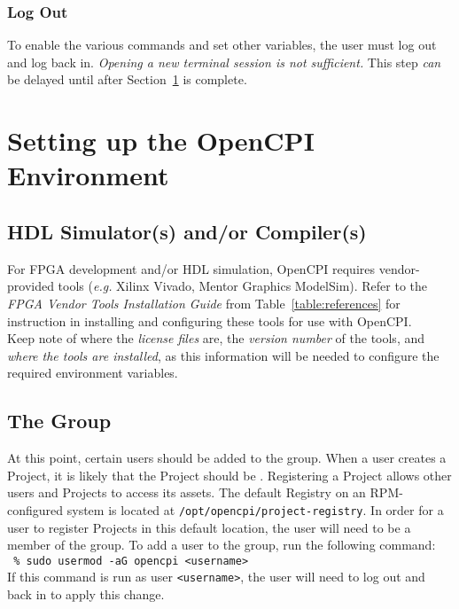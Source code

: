 \subsubsection{Log Out}
To enable the various  commands and set other variables, the user must log out and log back in. \textit{Opening a new terminal session is not sufficient.} This step \textit{can} be delayed until after Section~\ref{sec:setup_opencpi} is complete.

\section{Setting up the OpenCPI Environment}
\label{sec:setup_opencpi}
\subsection{HDL Simulator(s) and/or Compiler(s)}
\label{subsec:installing_fpga_vendor}
For FPGA development and/or HDL simulation, OpenCPI requires vendor-provided tools (\textit{e.g.} Xilinx Vivado, Mentor Graphics ModelSim). Refer to the \textit{FPGA Vendor Tools Installation Guide} from Table~\ref{table:references} for instruction in installing and configuring these tools for use with OpenCPI.\\

Keep note of where the \textit{license files} are, the \textit{version number} of the tools, and \textit{where the tools are installed}, as this information will be needed to configure the required environment variables.
\subsection{The  Group}
\label{subsec:opencpi_group}
At this point, certain users should be added to the  group. When a user creates a Project, it is likely that the Project should be . Registering a Project allows other users and Projects to access its assets. The default Registry on an RPM-configured system is located at \verb+/opt/opencpi/project-registry+. In order for a user to register Projects in this default location, the user will need to be a member of the  group. To add a user to the  group, run the following command:\\

\verb+ % sudo usermod -aG opencpi <username>+\\

If this command is run as user \verb+<username>+, the user will need to log out and back in to apply this change.\\

